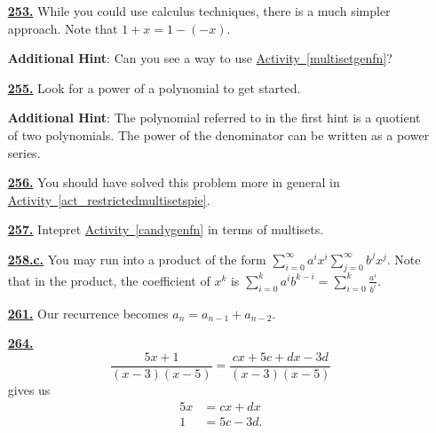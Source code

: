 \documentclass[10pt,]{book}
\theoremstyle{plain}
\theoremstyle{definition}
\theoremstyle{definition}
\theoremstyle{definition}
\numberwithin{equation}{chapter}
\newcommand{\amp}{&}
\begin{document}
\begin{itemize}[itemsep=1em]
\hypertarget{a-253}{}\item[\textbf{\hyperref[negnchoosek]{253.}}]
\hypertarget{p-1320}{}%
While you could use calculus techniques, there is a much simpler approach. Note that \(1 + x = 1 - (-x)\).%

\par\smallskip
\noindent\textbf{Additional Hint}: \hypertarget{p-1321}{}%
Can you see a way to use \hyperref[multisetgenfn]{Activity~\ref{multisetgenfn}}?%

\hypertarget{a-255}{}\item[\textbf{\hyperref[candygenfn]{255.}}]
\hypertarget{p-1326}{}%
Look for a power of a polynomial to get started.%

\par\smallskip
\noindent\textbf{Additional Hint}: \hypertarget{p-1327}{}%
The polynomial referred to in the first hint is a quotient of two polynomials.  The power of the denominator can be written as a power series.%

\hypertarget{a-256}{}\item[\textbf{\hyperref[activity-249]{256.}}]
\hypertarget{p-1331}{}%
You should have solved this problem more in general in \hyperref[act_restrictedmultisetspie]{Activity~\ref{act_restrictedmultisetspie}}.%

\hypertarget{a-257}{}\item[\textbf{\hyperref[activity-250]{257.}}]
\hypertarget{p-1333}{}%
Intepret \hyperref[candygenfn]{Activity~\ref{candygenfn}} in terms of multisets.%

\hypertarget{a-258.c}{}\item[\textbf{\hyperref[task-248]{258.c.}}]
\hypertarget{p-1343}{}%
You may run into a product of the form \(\sum_{i=0}^\infty a^ix^i\sum_{j=0}^\infty b^jx^j\). Note that in the product, the coefficient of \(x^k\) is \(\sum_{i=0}^k a^ib^{k-i} = \sum_{i=0}^k \frac{a^i}{b^i}\).%

\hypertarget{a-261}{}\item[\textbf{\hyperref[originalFibonacci]{261.}}]
\hypertarget{p-1351}{}%
Our recurrence becomes \(a_n = a_{n-1} + a_{n-2}\).%

\hypertarget{a-264}{}\item[\textbf{\hyperref[partialfractionsintro]{264.}}]
\hypertarget{p-1360}{}%
%
\begin{equation*}
\frac{5x+1}{(x-3)(x-5)} = \frac{cx+5c+dx-3d}{(x-3)(x-5)}
\end{equation*}
gives us%
\begin{align*}
5x \amp = cx+dx\\
1 \amp= 5c-3d\text{.}
\end{align*}
%


\end{itemize}
\end{document}
